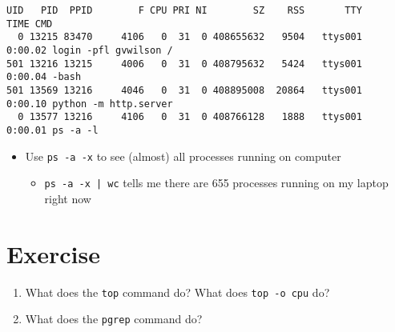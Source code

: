 \documentclass[krantzl]{krantz}
\begin{document}
\begin{lstlisting}[frame=tblr,backgroundcolor=\color{black!5}]
UID   PID  PPID        F CPU PRI NI        SZ    RSS       TTY       TIME CMD
  0 13215 83470     4106   0  31  0 408655632   9504   ttys001    0:00.02 login -pfl gvwilson /
501 13216 13215     4006   0  31  0 408795632   5424   ttys001    0:00.04 -bash
501 13569 13216     4046   0  31  0 408895008  20864   ttys001    0:00.10 python -m http.server
  0 13577 13216     4106   0  31  0 408766128   1888   ttys001    0:00.01 ps -a -l
\end{lstlisting}

\begin{itemize}
\item Use \texttt{ps -a -x} to see (almost) all processes running on computer\begin{itemize}
\item \texttt{ps -a -x | wc} tells me there are 655 processes running on my laptop right now

\end{itemize}


\end{itemize}
\section{Exercise}
\begin{enumerate}
\item 

What does the \texttt{top} command do?
    What does \texttt{top -o cpu} do?



\item 

What does the \texttt{pgrep} command do?



\end{enumerate}
\end{document}
